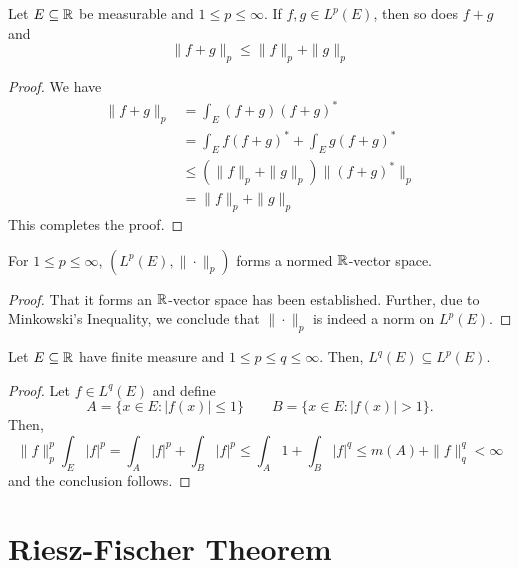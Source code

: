 \begin{theorem}[Minkowski]
    Let $E\subseteq\mathbb{R}$ be measurable and $1\le p\le\infty$. If $f,g\in L^p(E)$, then so does $f + g$ and 
    \begin{equation*}
        \|f + g\|_p\le\|f\|_p + \|g\|_p
    \end{equation*}
\end{theorem}
\begin{proof}
    We have 
    \begin{align*}
        \|f + g\|_p &= \int_E(f + g)(f + g)^*\\
        &= \int_E f(f + g)^* + \int_E g(f + g)^*\\
        &\le\left(\|f\|_p + \|g\|_p\right)\|(f + g)^*\|_p\\
        &= \|f\|_p + \|g\|_p
    \end{align*}
    This completes the proof.
\end{proof}

\begin{theorem}
    For $1\le p\le\infty$, $\left(L^p(E), \|\cdot\|_p\right)$ forms a normed $\mathbb{R}$-vector space.
\end{theorem}
\begin{proof}
    That it forms an $\mathbb{R}$-vector space has been established. Further, due to Minkowski's Inequality, we conclude that $\|\cdot\|_p$ is indeed a norm on $L^p(E)$.
\end{proof}

\begin{proposition}
    Let $E\subseteq\mathbb{R}$ have finite measure and $1\le p\le q\le\infty$. Then, $L^q(E)\subseteq L^p(E)$.
\end{proposition}
\begin{proof}
    Let $f\in L^q(E)$ and define 
    \begin{equation*}
        A = \{x\in E\colon |f(x)|\le 1\}\qquad B = \{x\in E\colon |f(x)| > 1\}.
    \end{equation*}
    Then, 
    \begin{equation*}
        \|f\|_p^p\int_E|f|^p = \int_A |f|^p + \int_B |f|^p\le\int_A 1 + \int_B |f|^q\le m(A) + \|f\|_q^q < \infty
    \end{equation*}
    and the conclusion follows. 
\end{proof}

\section{Riesz-Fischer Theorem}

